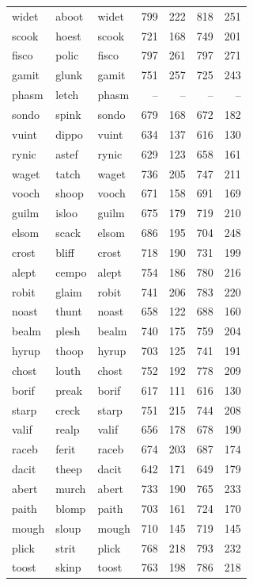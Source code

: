 \documentclass[
]{interact}
\begin{document}
\begin{longtable*}{lllrrrr}
widet & aboot & widet & 799 & 222 & 818 & 251 \\ 
scook & hoest & scook & 721 & 168 & 749 & 201 \\ 
fisco & polic & fisco & 797 & 261 & 797 & 271 \\ 
gamit & glunk & gamit & 751 & 257 & 725 & 243 \\ 
phasm & letch & phasm & – & – & – & – \\ 
sondo & spink & sondo & 679 & 168 & 672 & 182 \\ 
vuint & dippo & vuint & 634 & 137 & 616 & 130 \\ 
rynic & astef & rynic & 629 & 123 & 658 & 161 \\ 
waget & tatch & waget & 736 & 205 & 747 & 211 \\ 
vooch & shoop & vooch & 671 & 158 & 691 & 169 \\ 
guilm & isloo & guilm & 675 & 179 & 719 & 210 \\ 
elsom & scack & elsom & 686 & 195 & 704 & 248 \\ 
crost & bliff & crost & 718 & 190 & 731 & 199 \\ 
alept & cempo & alept & 754 & 186 & 780 & 216 \\ 
robit & glaim & robit & 741 & 206 & 783 & 220 \\ 
noast & thunt & noast & 658 & 122 & 688 & 160 \\ 
bealm & plesh & bealm & 740 & 175 & 759 & 204 \\ 
hyrup & thoop & hyrup & 703 & 125 & 741 & 191 \\ 
chost & louth & chost & 752 & 192 & 778 & 209 \\ 
borif & preak & borif & 617 & 111 & 616 & 130 \\ 
starp & creck & starp & 751 & 215 & 744 & 208 \\ 
valif & realp & valif & 656 & 178 & 678 & 190 \\ 
raceb & ferit & raceb & 674 & 203 & 687 & 174 \\ 
dacit & theep & dacit & 642 & 171 & 649 & 179 \\ 
abert & murch & abert & 733 & 190 & 765 & 233 \\ 
paith & blomp & paith & 703 & 161 & 724 & 170 \\ 
mough & sloup & mough & 710 & 145 & 719 & 145 \\ 
plick & strit & plick & 768 & 218 & 793 & 232 \\ 
toost & skinp & toost & 763 & 198 & 786 & 218 \\ 

\end{longtable*}
\end{document}
